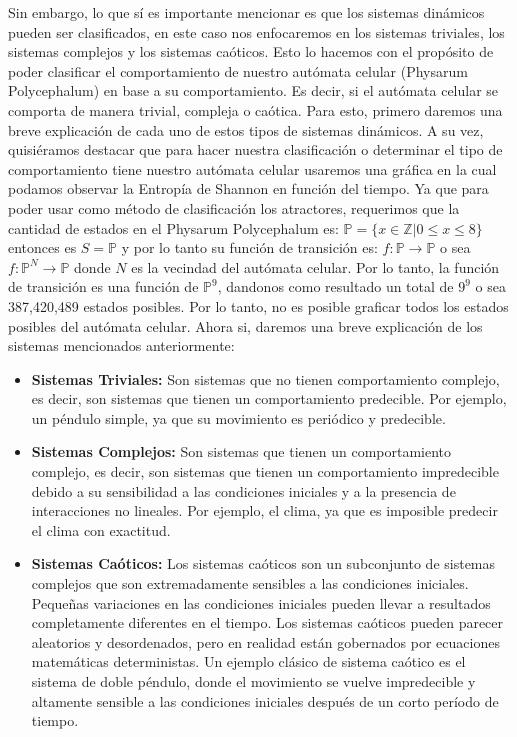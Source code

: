        Sin embargo, lo que s\'i es importante mencionar es que los sistemas din\'amicos pueden ser clasificados,
        en este caso nos enfocaremos en los sistemas triviales, los sistemas complejos y los sistemas ca\'oticos.
    \vskip 0.5cm
    Esto lo hacemos con el prop\'osito de poder clasificar el comportamiento de nuestro aut\'omata celular (Physarum Polycephalum)
        en base a su comportamiento. Es decir, si el aut\'omata celular se comporta de manera trivial, compleja o ca\'otica.
        Para esto, primero daremos una breve explicaci\'on de cada uno de estos tipos de sistemas din\'amicos. A su vez, 
        quisi\'eramos destacar que para hacer nuestra clasificaci\'on o determinar el tipo de comportamiento tiene nuestro aut\'omata
        celular usaremos una gr\'afica en la cual podamos observar la Entrop\'ia de Shannon en funci\'on del tiempo. Ya que para
        poder usar como m\'etodo de clasificaci\'on los atractores, requerimos que la cantidad de estados en el Physarum Polycephalum
        es: $\mathbb{P} = \{x \in \mathbb{Z}| 0 \leq x \leq 8\}$ entonces es $S = \mathbb{P}$ y por lo tanto su funci\'on de transici\'on es: 
        $f: \mathbb{P} \rightarrow \mathbb{P}$ o sea $f: \mathbb{P}^{N} \rightarrow \mathbb{P}$ donde $N$ es la vecindad del aut\'omata celular.
        Por lo tanto, la funci\'on de transici\'on es una funci\'on de $\mathbb{P}^{9}$, 
        dandonos como resultado un total de $9^{9}$ o sea 387,420,489 estados posibles. Por lo tanto, no es posible graficar todos los
        estados posibles del aut\'omata celular.
    \vskip 0.5cm
    Ahora si, daremos una breve explicaci\'on de los sistemas mencionados anteriormente:
    \begin{itemize}
        \item \textbf{Sistemas Triviales:} Son sistemas que no tienen comportamiento complejo, es decir, son sistemas que
            tienen un comportamiento predecible. Por ejemplo, un p\'endulo simple, ya que su movimiento es peri\'odico y predecible.
        \item \textbf{Sistemas Complejos:} Son sistemas que tienen un comportamiento complejo, es decir, son sistemas que
            tienen un comportamiento impredecible debido a su sensibilidad a las condiciones iniciales y a la presencia de interacciones no 
            lineales.  Por ejemplo, el clima, ya que es imposible predecir el clima con exactitud.
        \item \textbf{Sistemas Ca\'oticos:} Los sistemas ca\'oticos son un subconjunto de sistemas complejos que son extremadamente sensibles 
            a las condiciones iniciales. Peque\~nas variaciones en las condiciones iniciales pueden llevar a resultados completamente diferentes en el
            tiempo. Los sistemas ca\'oticos pueden parecer aleatorios y desordenados, pero en realidad est\'an gobernados por ecuaciones matem\'aticas 
            deterministas. Un ejemplo cl\'asico de sistema ca\'otico es el sistema de doble p\'endulo, donde el movimiento se vuelve impredecible y 
            altamente sensible a las condiciones iniciales despu\'es de un corto per\'iodo de tiempo.
    \end{itemize}
